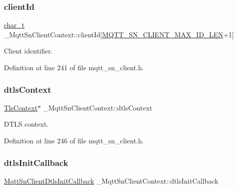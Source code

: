 \subsubsection{\texorpdfstring{client\+Id}{clientId}}
{\footnotesize\ttfamily \hyperlink{compiler__port_8h_a40bb5262bf908c328fbcfbe5d29d0201}{char\+\_\+t} \+\_\+\+Mqtt\+Sn\+Client\+Context\+::client\+Id\mbox{[}\hyperlink{mqtt__sn__client_8h_a8903ddd9dd0e6d56d19a16aa63381389}{M\+Q\+T\+T\+\_\+\+S\+N\+\_\+\+C\+L\+I\+E\+N\+T\+\_\+\+M\+A\+X\+\_\+\+I\+D\+\_\+\+L\+EN}+1\mbox{]}}



Client identifier. 



Definition at line 241 of file mqtt\+\_\+sn\+\_\+client.\+h.

\mbox{\label{struct__MqttSnClientContext_abf7251659cdc6c9ecd3d47335525c423}} 
\subsubsection{\texorpdfstring{dtls\+Context}{dtlsContext}}
{\footnotesize\ttfamily \hyperlink{tls_8h_ac09f7a286c0cdf9b07ee1edd107946f5}{Tls\+Context}$\ast$ \+\_\+\+Mqtt\+Sn\+Client\+Context\+::dtls\+Context}



D\+T\+LS context. 



Definition at line 246 of file mqtt\+\_\+sn\+\_\+client.\+h.

\mbox{\label{struct__MqttSnClientContext_ab8aacb0497d1136187224400815cf184}} 
\subsubsection{\texorpdfstring{dtls\+Init\+Callback}{dtlsInitCallback}}
{\footnotesize\ttfamily \hyperlink{mqtt__sn__client_8h_a0aa65bd0e127e05595c247c01aeca2d5}{Mqtt\+Sn\+Client\+Dtls\+Init\+Callback} \+\_\+\+Mqtt\+Sn\+Client\+Context\+::dtls\+Init\+Callback}



